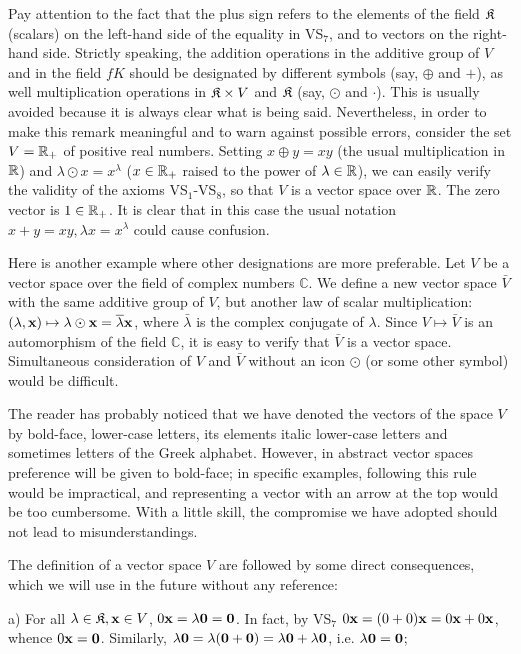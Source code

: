 Pay attention to the fact that the plus sign refers to the elements of the field ${\mathfrak{K}}$ (scalars) on the left-hand side of the equality in VS$_7$, and to vectors on the right-hand side. Strictly speaking, the addition operations in the additive group of $V$ and in the field $fK$ should be designated by different symbols (say, $\oplus$ and $+$), as well multiplication operations in ${\mathfrak{K}} \times V$ and ${\mathfrak{K}}$ (say, $\odot$ and $\cdot$). This is usually avoided because it is always clear what is being said. Nevertheless, in order to make this remark meaningful and to warn against possible errors, consider the set $V = {\mathbb{R}}_+$ of positive real numbers. Setting $x\oplus y=xy$ (the usual multiplication in ${\mathbb{R}}$) and $\lambda \odot x=x^\lambda$ ($x\in {\mathbb{R}}_+$ raised to the power of $\lambda\in{\mathbb{R}}$), we can easily verify the validity of the axioms VS$_1$-VS$_8$, so that $V$ is a vector space over ${\mathbb{R}}$. The zero vector is $1\in{\mathbb{R}}_+$. It is clear that in this case the usual notation $x + y = xy, \lambda x=x^\lambda$ could cause confusion.

Here is another example where other designations are more preferable. Let $V$ be a vector space over the field of complex numbers $\mathbb{C}$. We define a new vector space $\bar{V}$ with the same additive group of $V$, but another law of scalar multiplication: $(\lambda ,{\mathbf{x}})\mapsto \lambda \odot {\mathbf{x}} = \overline{\lambda}{\mathbf{x}}$, where $\bar{\lambda}$ is the complex conjugate of $\lambda$. Since $V \mapsto \bar{V}$ is an automorphism of the field $\mathbb{C}$, it is easy to verify that $\bar{V}$ is a vector space. Simultaneous consideration of $V$ and $\bar{V}$ without an icon $\odot$ (or some other symbol) would be difficult.

\begin{convention}
	The reader has probably noticed that we have denoted the vectors of the space $V$ by bold-face, lower-case letters, its elements italic lower-case letters and sometimes letters of the Greek alphabet. However, in abstract vector spaces preference will be given to bold-face; in specific examples, following this rule would be impractical, and representing a vector with an arrow at the top would be too cumbersome. With a little skill, the compromise we have adopted should not lead to misunderstandings.
\end{convention}

The definition of a vector space $V$ are followed by some direct consequences, which we will use in the future without any reference:

a) For all $\lambda\in{\mathfrak{K}}, {\mathbf{x}}\in V$, $0\vx = \lambda\v0 = \v0$. In fact, by VS$_7$ $0{\mathbf{x}}=(0+0){\mathbf{x}} =0{\mathbf{x}} +0{\mathbf{x}}$, whence $0\vx =\v0$. Similarly, $\lambda \v0 =\lambda(\v0+\v0)=\lambda\v0 +\lambda \v0$, i.e. $\lambda\v0 =\v0$;

